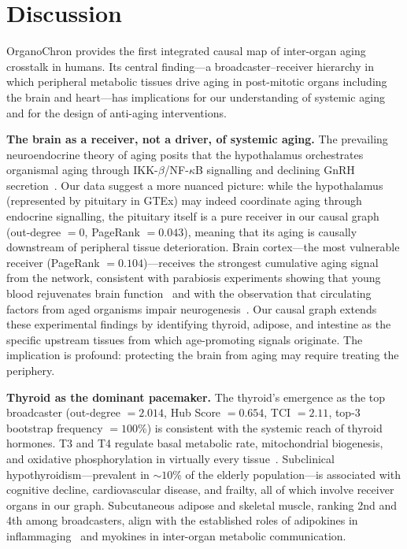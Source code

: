 \documentclass[11pt,a4paper]{article}
\begin{document}
\section*{Discussion}

OrganoChron provides the first integrated causal map of inter-organ aging crosstalk in humans. Its central finding---a broadcaster--receiver hierarchy in which peripheral metabolic tissues drive aging in post-mitotic organs including the brain and heart---has implications for our understanding of systemic aging and for the design of anti-aging interventions.

\textbf{The brain as a receiver, not a driver, of systemic aging.} The prevailing neuroendocrine theory of aging posits that the hypothalamus orchestrates organismal aging through IKK-$\beta$/NF-$\kappa$B signalling and declining GnRH secretion~\cite{ref11}. Our data suggest a more nuanced picture: while the hypothalamus (represented by pituitary in GTEx) may indeed coordinate aging through endocrine signalling, the pituitary itself is a pure receiver in our causal graph (out-degree $= 0$, PageRank $= 0.043$), meaning that its aging is causally downstream of peripheral tissue deterioration. Brain cortex---the most vulnerable receiver (PageRank $= 0.104$)---receives the strongest cumulative aging signal from the network, consistent with parabiosis experiments showing that young blood rejuvenates brain function~\cite{ref7,ref8} and with the observation that circulating factors from aged organisms impair neurogenesis~\cite{ref10}. Our causal graph extends these experimental findings by identifying thyroid, adipose, and intestine as the specific upstream tissues from which age-promoting signals originate. The implication is profound: protecting the brain from aging may require treating the periphery.

\textbf{Thyroid as the dominant pacemaker.} The thyroid's emergence as the top broadcaster (out-degree $= 2.014$, Hub Score $= 0.654$, TCI $= 2.11$, top-3 bootstrap frequency $= 100$\%) is consistent with the systemic reach of thyroid hormones. T3 and T4 regulate basal metabolic rate, mitochondrial biogenesis, and oxidative phosphorylation in virtually every tissue~\cite{ref23,ref24}. Subclinical hypothyroidism---prevalent in ${\sim}10$\% of the elderly population---is associated with cognitive decline, cardiovascular disease, and frailty, all of which involve receiver organs in our graph. Subcutaneous adipose and skeletal muscle, ranking 2nd and 4th among broadcasters, align with the established roles of adipokines in inflammaging~\cite{ref9,ref25} and myokines in inter-organ metabolic communication.
\end{document}
